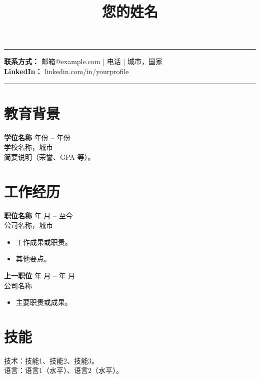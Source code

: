 \documentclass[11pt,a4paper]{article}
\title{\vspace{-1.2cm}\textbf{您的姓名}}
\author{}
\date{}
\begin{document}
\maketitle
\vspace{-0.8cm}

\begin{flushright}\rule{2.2cm}{2.8cm}\end{flushright}

\textbf{联系方式：} 邮箱@example.com \quad | \quad 电话 \quad | \quad 城市，国家 \\
\textbf{LinkedIn：} linkedin.com/in/yourprofile

\vspace{0.4cm}
\noindent\rule{\textwidth}{0.4pt}

\section*{教育背景}
\textbf{学位名称} \hfill 年份 -- 年份 \\
学校名称，城市 \\
简要说明（荣誉、GPA 等）。

\section*{工作经历}
\textbf{职位名称} \hfill 年 月 -- 至今 \\
公司名称，城市 \\
\begin{itemize}
  \item 工作成果或职责。
  \item 其他要点。
\end{itemize}

\textbf{上一职位} \hfill 年 月 -- 年 月 \\
公司名称 \\
\begin{itemize}
  \item 主要职责或成果。
\end{itemize}

\section*{技能}
技术：技能1、技能2、技能3。 \\
语言：语言1（水平）、语言2（水平）。
\end{document}
